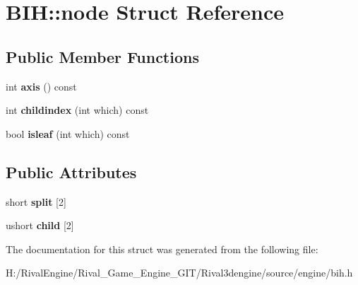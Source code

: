 \hypertarget{struct_b_i_h_1_1node}{}\section{B\+IH\+:\+:node Struct Reference}
\label{struct_b_i_h_1_1node}
\subsection*{Public Member Functions}
\begin{DoxyCompactItemize}
\item 
\mbox{\label{struct_b_i_h_1_1node_a8b3c84f81adc9af3438bce7529535361}} 
int {\bfseries axis} () const
\item 
\mbox{\label{struct_b_i_h_1_1node_a9d8e0f674965eb5eaf220ce7a149c2dd}} 
int {\bfseries childindex} (int which) const
\item 
\mbox{\label{struct_b_i_h_1_1node_a812d7e1fcca1e89ebe95619903b5f602}} 
bool {\bfseries isleaf} (int which) const
\end{DoxyCompactItemize}
\subsection*{Public Attributes}
\begin{DoxyCompactItemize}
\item 
\mbox{\label{struct_b_i_h_1_1node_a048dd22603edbd24593eb8ca6ae0dd55}} 
short {\bfseries split} \mbox{[}2\mbox{]}
\item 
\mbox{\label{struct_b_i_h_1_1node_ace328cc3c7811706590733899a23e3ee}} 
ushort {\bfseries child} \mbox{[}2\mbox{]}
\end{DoxyCompactItemize}


The documentation for this struct was generated from the following file\+:\begin{DoxyCompactItemize}
\item 
H\+:/\+Rival\+Engine/\+Rival\+\_\+\+Game\+\_\+\+Engine\+\_\+\+G\+I\+T/\+Rival3dengine/source/engine/bih.\+h\end{DoxyCompactItemize}
